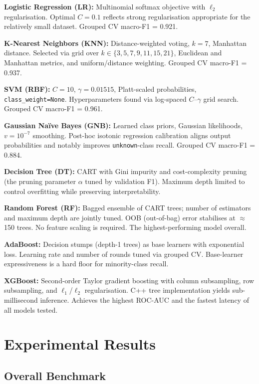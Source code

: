 \documentclass[conference]{IEEEtran}
\begin{document}
\textbf{Logistic Regression (LR):} Multinomial softmax objective with $\ell_2$ regularisation. Optimal $C{=}0.1$ reflects strong regularisation appropriate for the relatively small dataset. Grouped CV macro-F1 = 0.921.

\textbf{K-Nearest Neighbors (KNN):} Distance-weighted voting, $k{=}7$, Manhattan distance. Selected via grid over $k \in \{3,5,7,9,11,15,21\}$, Euclidean and Manhattan metrics, and uniform/distance weighting. Grouped CV macro-F1 = 0.937.

\textbf{SVM (RBF):} $C{=}10$, $\gamma{=}0.01515$, Platt-scaled probabilities, \texttt{class\_weight=None}. Hyperparameters found via log-spaced $C$--$\gamma$ grid search. Grouped CV macro-F1 = 0.961.

\textbf{Gaussian Na\"{i}ve Bayes (GNB):} Learned class priors, Gaussian likelihoods, $v{=}10^{-7}$ smoothing. Post-hoc isotonic regression calibration aligns output probabilities and notably improves \texttt{unknown}-class recall. Grouped CV macro-F1 = 0.884.

\textbf{Decision Tree (DT):} CART with Gini impurity and cost-complexity pruning (the pruning parameter $\alpha$ tuned by validation F1). Maximum depth limited to control overfitting while preserving interpretability.

\textbf{Random Forest (RF):} Bagged ensemble of CART trees; number of estimators and maximum depth are jointly tuned. OOB (out-of-bag) error stabilises at $\approx$150 trees. No feature scaling is required. The highest-performing model overall.

\textbf{AdaBoost:} Decision stumps (depth-1 trees) as base learners with exponential loss. Learning rate and number of rounds tuned via grouped CV. Base-learner expressiveness is a hard floor for minority-class recall.

\textbf{XGBoost:} Second-order Taylor gradient boosting with column subsampling, row subsampling, and $\ell_1$/$\ell_2$ regularisation. C++ tree implementation yields sub-millisecond inference. Achieves the highest ROC-AUC and the fastest latency of all models tested.

\section{Experimental Results}
\label{sec:results}

\subsection{Overall Benchmark}
\end{document}
